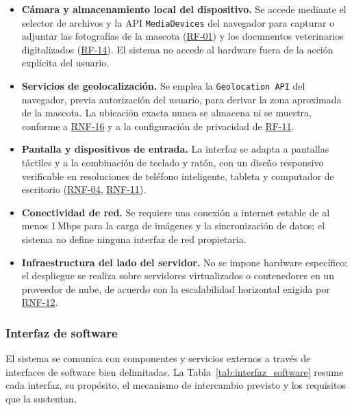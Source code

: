 \documentclass[journal,onecolumn]{IEEEtran}
\begin{document}
	\begin{itemize}[leftmargin=*]
		\item \textbf{Cámara y almacenamiento local del dispositivo.} Se accede
		mediante el selector de archivos y la API \texttt{MediaDevices} del
		navegador para capturar o adjuntar las fotografías de la mascota (\hyperref[tab:RF-01]{RF-01})
		y los documentos veterinarios digitalizados (\hyperref[tab:RF-14]{RF-14}). El sistema no accede
		al hardware fuera de la acción explícita del usuario.
		\item \textbf{Servicios de geolocalización.} Se emplea la
		\texttt{Geolocation API} del navegador, previa autorización del usuario,
		para derivar la zona aproximada de la mascota. La ubicación exacta nunca
		se almacena ni se muestra, conforme a \hyperref[tab:RNF-16]{RNF-16} y a la configuración de
		privacidad de \hyperref[tab:RF-11]{RF-11}.
		\item \textbf{Pantalla y dispositivos de entrada.} La interfaz se adapta a
		pantallas táctiles y a la combinación de teclado y ratón, con un diseño
		responsivo verificable en resoluciones de teléfono inteligente, tableta y
		computador de escritorio (\hyperref[tab:RNF-04]{RNF-04}, \hyperref[tab:RNF-11]{RNF-11}).
		\item \textbf{Conectividad de red.} Se requiere una conexión a internet
		estable de al menos 1\,Mbps para la carga de imágenes y la sincronización
		de datos; el sistema no define ninguna interfaz de red propietaria.
		\item \textbf{Infraestructura del lado del servidor.} No se impone hardware
		específico: el despliegue se realiza sobre servidores virtualizados o
		contenedores en un proveedor de nube, de acuerdo con la escalabilidad
		horizontal exigida por \hyperref[tab:RNF-12]{RNF-12}.
	\end{itemize}
	
	\subsubsection{Interfaz de software}
	\label{sec:interfaz-software}
	
	El sistema se comunica con componentes y servicios externos a través de
	interfaces de software bien delimitadas. La Tabla~\ref{tab:interfaz_software}
	resume cada interfaz, su propósito, el mecanismo de intercambio previsto y
	los requisitos que la sustentan.
	
\end{document}
